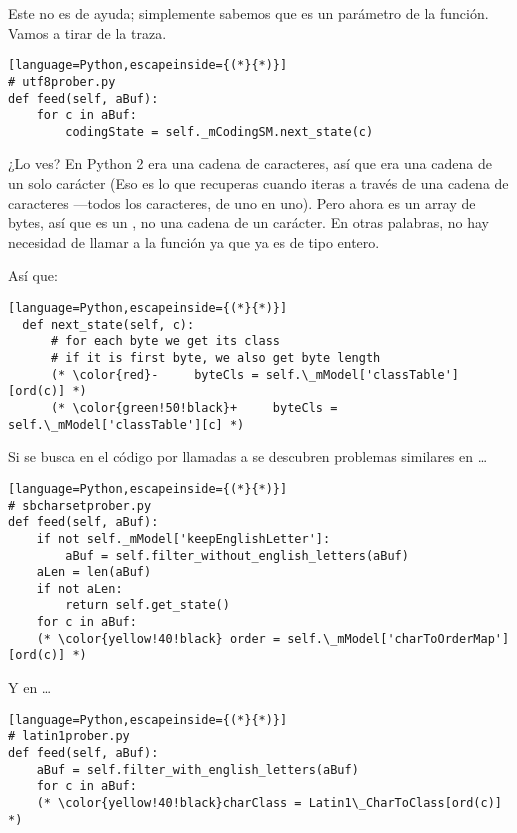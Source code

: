 Este no es de ayuda; simplemente sabemos que es un parámetro de la función. Vamos a tirar de la traza.

\begin{lstlisting}[language=Python,escapeinside={(*}{*)}]
# utf8prober.py
def feed(self, aBuf):
    for c in aBuf:
        codingState = self._mCodingSM.next_state(c)
\end{lstlisting}

¿Lo ves? En Python 2  era una cadena de caracteres, así que  era una cadena de un solo carácter (Eso es lo que recuperas cuando iteras a través de una cadena de caracteres ---todos los caracteres, de uno en uno). Pero ahora  es un array de bytes, así que  es un , no una cadena de un carácter. En otras palabras, no hay necesidad de llamar a la función  ya que  ya es de tipo entero.

Así que:


\begin{lstlisting}[language=Python,escapeinside={(*}{*)}]
  def next_state(self, c):
      # for each byte we get its class
      # if it is first byte, we also get byte length
      (* \color{red}-     byteCls = self.\_mModel['classTable'][ord(c)] *)
      (* \color{green!50!black}+     byteCls = self.\_mModel['classTable'][c] *)
\end{lstlisting}

Si se busca en el código por llamadas a  se descubren problemas similares en \ldots

\begin{lstlisting}[language=Python,escapeinside={(*}{*)}]
# sbcharsetprober.py
def feed(self, aBuf):
    if not self._mModel['keepEnglishLetter']:
        aBuf = self.filter_without_english_letters(aBuf)
    aLen = len(aBuf)
    if not aLen:
        return self.get_state()
    for c in aBuf:
    (* \color{yellow!40!black} order = self.\_mModel['charToOrderMap'][ord(c)] *)
\end{lstlisting}

Y en \ldots


\begin{lstlisting}[language=Python,escapeinside={(*}{*)}]
# latin1prober.py
def feed(self, aBuf):
    aBuf = self.filter_with_english_letters(aBuf)
    for c in aBuf:
    (* \color{yellow!40!black}charClass = Latin1\_CharToClass[ord(c)] *)
\end{lstlisting}

